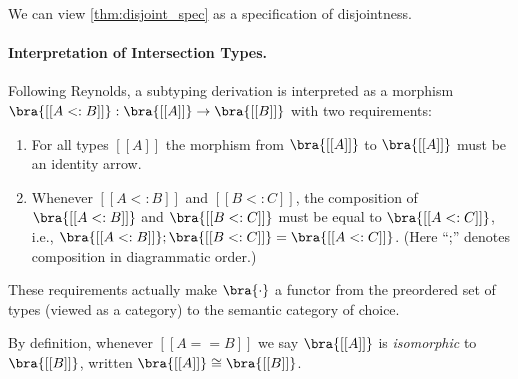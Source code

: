 \begin{remark}
  We can view \cref{thm:disjoint_spec} as a specification of disjointness.
\end{remark}


\paragraph{Interpretation of Intersection Types.}

Following Reynolds, a subtyping derivation is interpreted as a morphism $ \bra{[[ A <: B ]]} : \bra{[[A]]} \rightarrow \bra{[[B]]} $ with two requirements:
\begin{enumerate}
\item For all types $[[A]]$ the morphism from $ \bra{[[A]]}$ to $\bra{[[A]]}$ must be an identity arrow.
\item Whenever $[[A <: B]]$ and $[[ B <: C  ]]$, the composition of $\bra{[[ A <: B ]]}$ and $\bra{[[  B <: C   ]]}$ must be equal to $\bra{[[  A <: C  ]]}$, i.e., $ \bra{[[ A <: B ]]} ; \bra{[[  B <: C  ]]} = \bra{[[A <: C]]}$. (Here ``;'' denotes composition in diagrammatic order.)
\end{enumerate}
These requirements actually make $ \bra{\cdot} $ a functor from the
preordered set of types (viewed as a category) to the semantic category of
choice.

\begin{remark}
By definition, whenever $[[ A == B ]]$ we say $\bra{[[  A  ]]}$ is \textit{isomorphic} to $\bra{[[ B ]]}$, written $\bra{[[ A ]]} \cong \bra{[[B]]}$.
\end{remark}

